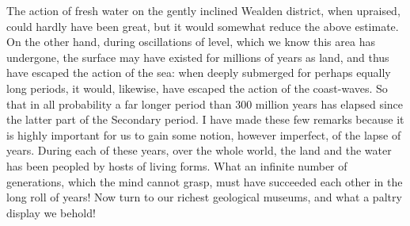 The action of fresh water on the gently inclined Wealden district, when upraised, could hardly have been great, but it would somewhat reduce the above estimate. On the other hand, during oscillations of level, which we know this area has undergone, the surface may have existed for millions of years as land, and thus have escaped the action of the sea: when deeply submerged for perhaps equally long periods, it would, likewise, have escaped the action of the coast-waves. So that in all probability a far longer period than 300 million years has elapsed since the latter part of the Secondary period.
I have made these few remarks because it is highly important for us to gain some notion, however imperfect, of the lapse of years. During each of these years, over the whole world, the land and the water has been peopled by hosts of living forms. What an infinite number of generations, which the mind cannot grasp, must have succeeded each other in the long roll of years! Now turn to our richest geological museums, and what a paltry display we behold!

